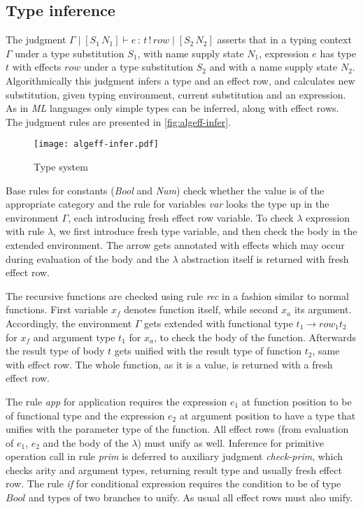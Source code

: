 \documentclass[inz, english, shortabstract]{iithesis}
\begin{document}
\subsection{Type inference}
The judgment $ \Gamma \mid [S_1 \, N_1] \vdash e \, : \, t \, ! \, row \mid [S_2 \, N_2] $ asserts that in a typing context $ \Gamma $ under a type substitution $ S_1 $, with name supply state $ N_1 $, expression $ e $ has type $ t $ with effects $ row $ under a type substitution $ S_2 $ and with a name supply state $ N_2 $.
Algorithmically this judgment infers a type and an effect row, and calculates new substitution, given typing environment, current substitution and an expression.
As in \emph{ML} languages only simple types can be inferred, along with effect rows.
The judgment rules are presented in \autoref{fig:algeff-infer}.

\begin{figure}
  \centering
  \texttt{[image: algeff-infer.pdf]}
  \caption{Type system} 
  \label{fig:algeff-infer} 
\end{figure}

Base rules for constants (\emph{Bool} and \emph{Num}) check whether the value is of the appropriate category and the rule for variables \emph{var} looks the type up in the environment $\Gamma$, each introducing fresh effect row variable.
To check $ \lambda $ expression with rule $\lambda$, we first introduce fresh type variable, and then check the body in the extended environment.
The arrow gets annotated with effects which may occur during evaluation of the body and the $ \lambda $ abstraction itself is returned with fresh effect row.

The recursive functions are checked using rule \emph{rec} in a fashion similar to normal functions.
First variable $x_f$ denotes function itself, while second $x_a$ its argument.
Accordingly, the environment $\Gamma$ gets extended with functional type $ t_1 \rightarrow row_1 t_2 $ for $x_f$ and argument type $ t_1 $ for $x_a$, to check the body of the function.
Afterwards the result type of body $ t $ gets unified with the result type of function $ t_2 $, same with effect row.
The whole function, as it is a value, is returned with a fresh effect row.

The rule \emph{app} for application requires the expression $e_1$ at function position to be of functional type and the expression $e_2$ at argument position to have a type that unifies with the parameter type of the function. 
All effect rows (from evaluation of $e_1$, $e_2$ and the body of the $\lambda$) must unify as well.
Inference for primitive operation call in rule \emph{prim} is deferred to auxiliary judgment \emph{check-prim}, which checks arity and argument types, returning result type and usually fresh effect row.
The rule \emph{if} for conditional expression requires the condition to be of type $ Bool $ and types of two branches to unify.
As usual all effect rows must also unify.
\end{document}
